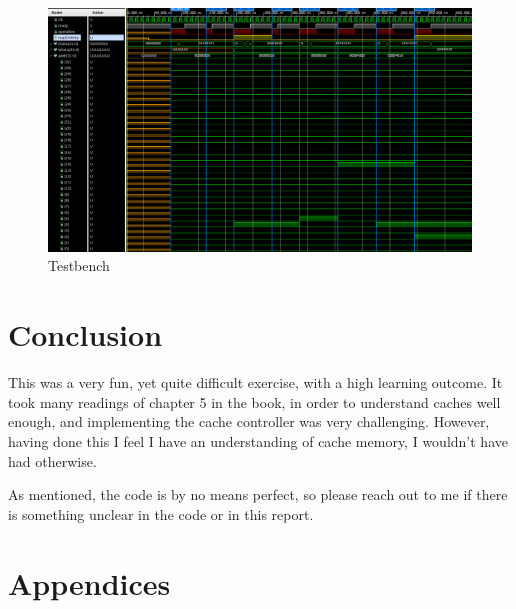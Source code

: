 \documentclass{article}
\begin{document}
\begin{figure}[H]
 \centering
  \includegraphics[width=400pt]{img/testbench1.png}
 \caption{Testbench}
  \label{TESTBENCH1}
 \end{figure}



\section{Conclusion}
This was a very fun, yet quite difficult exercise, with a high learning outcome. It took many readings of chapter 5 in the book, in order to understand caches well enough, and implementing the cache controller was very challenging. However, having done this I feel I have an understanding of cache memory, I wouldn't have had otherwise.

As mentioned, the code is by no means perfect, so please reach out to me if there is something unclear in the code or in this report.

\section{Appendices}
\end{document}
